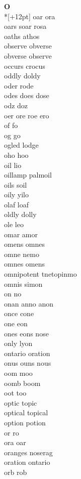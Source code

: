 \vspace{14pt}
\noindent\textbf{\Large O}\\*[+12pt]
oar ora\\
oars soar rosa\\
oaths athos\\
observe obverse\\
obverse observe\\
occurs crocus\\
oddly doldy\\
oder rode\\
odes does dose\\
odz doz\\
oer ore roe ero\\
of fo\\
og go\\
ogled lodge\\
oho hoo\\
oil lio\\
oillamp palmoil\\
oils soil\\
oily yilo\\
olaf loaf\\
oldly dolly\\
ole leo\\
omar amor\\
omens omnes\\
omne nemo\\
omnes omens\\
omnipotent tnetopinmo\\
omnis simon\\
on no\\
onan anno anon\\
once cone\\
one eon\\
ones eons nose\\
only lyon\\
ontario oration\\
onus ouns nous\\
oom moo\\
oomb boom\\
oot too\\
optic topic\\
optical topical\\
option potion\\
or ro\\
ora oar\\
oranges noserag\\
oration ontario\\
orb rob\\
